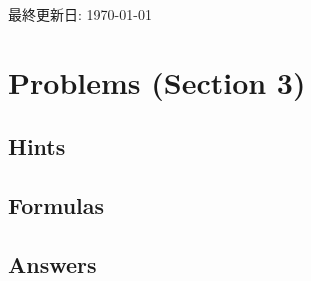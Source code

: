 

\usepackage[color]{showkeys}
\usepackage{afterpage}
\pagestyle{fancy}%
\fancyhead[L]{\textsc{\rightmark}}%
%  
\fancyhead[R]{\thepage}
\fancyfoot{}%
\renewcommand{\contentsname}{Contents}%
\newcommand{\toi}[1]{\noindent\fbox{\large\color{blue}{#1}}\\\nopagebreak}
\newcommand{\itemlabel}[1]{\noindent\uline{#1}\,\nopagebreak}


\nocite{*}

\hrulefill\\

\begin{flushright}%
  最終更新日: \today
\end{flushright}%


\setcounter{section}{2}
\section{Problems (Section 3)}

\subsection{Hints}


\clearpage
\subsection{Formulas}


\clearpage
\subsection{Answers}





